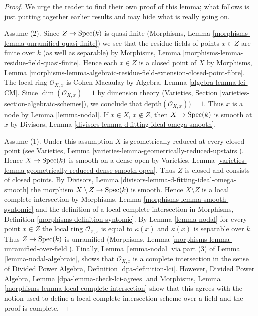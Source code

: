 \begin{proof}
We urge the reader to find their own proof of
this lemma; what follows is just putting together earlier results
and may hide what is really going on.

\medskip\noindent
Assume (2). Since $Z \to \mathop{\mathrm{Spec}}(k)$ is quasi-finite
(Morphisms, Lemma \ref{morphisms-lemma-unramified-quasi-finite})
we see that the residue fields of points $x \in Z$ are finite
over $k$ (as well as separable) by
Morphisms, Lemma \ref{morphisms-lemma-residue-field-quasi-finite}.
Hence each $x \in Z$ is a closed point of $X$ by
Morphisms, Lemma
\ref{morphisms-lemma-algebraic-residue-field-extension-closed-point-fibre}.
The local ring $\mathcal{O}_{X, x}$ is Cohen-Macaulay by
Algebra, Lemma \ref{algebra-lemma-lci-CM}.
Since $\dim(\mathcal{O}_{X, x}) = 1$ by dimension theory
(Varieties, Section \ref{varieties-section-algebraic-schemes}), we conclude
that $\text{depth}(\mathcal{O}_{X, x})) = 1$. Thus $x$ is a node
by Lemma \ref{lemma-nodal}. If $x \in X$, $x \not \in Z$, then
$X \to \mathop{\mathrm{Spec}}(k)$ is smooth at $x$ by
Divisors, Lemma \ref{divisors-lemma-d-fitting-ideal-omega-smooth}.

\medskip\noindent
Assume (1). Under this assumption $X$ is geometrically reduced
at every closed point (see
Varieties, Lemma \ref{varieties-lemma-geometrically-reduced-upstairs}).
Hence $X \to \mathop{\mathrm{Spec}}(k)$ is smooth on a dense open by
Varieties, Lemma \ref{varieties-lemma-geometrically-reduced-dense-smooth-open}.
Thus $Z$ is closed and consists of closed points.
By Divisors, Lemma \ref{divisors-lemma-d-fitting-ideal-omega-smooth}
the morphism $X \setminus Z \to \mathop{\mathrm{Spec}}(k)$ is smooth.
Hence $X \setminus Z$ is a local complete intersection by
Morphisms, Lemma \ref{morphisms-lemma-smooth-syntomic}
and the definition of a local complete intersection in
Morphisms, Definition \ref{morphisms-definition-syntomic}.
By Lemma \ref{lemma-nodal} for every point $x \in Z$
the local ring $\mathcal{O}_{Z, x}$ is equal to $\kappa(x)$
and $\kappa(x)$ is separable over $k$. Thus $Z \to \mathop{\mathrm{Spec}}(k)$
is unramified (Morphisms, Lemma \ref{morphisms-lemma-unramified-over-field}).
Finally, Lemma \ref{lemma-nodal} via part (3) of
Lemma \ref{lemma-nodal-algebraic}, shows that $\mathcal{O}_{X, x}$
is a complete intersection in the sense of
Divided Power Algebra, Definition \ref{dpa-definition-lci}.
However, Divided Power Algebra, Lemma \ref{dpa-lemma-check-lci-agrees}
and Morphisms, Lemma \ref{morphisms-lemma-local-complete-intersection}
show that this agrees with the notion used to define a local
complete intersection scheme over a field and the proof is complete.
\end{proof}

